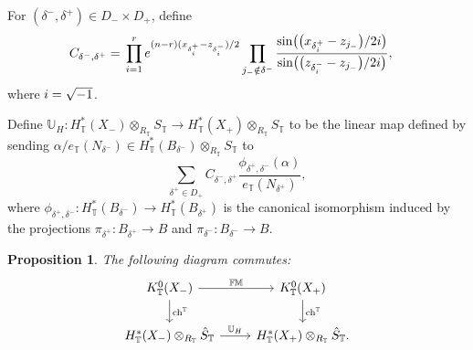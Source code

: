 \documentclass[11pt]{article}
\numberwithin{equation}{section}
\newtheorem{Proposition}[Theorem]{Proposition}
 { \theoremstyle{definition}
\newtheorem{Definition}[Theorem]{Definition}
\newtheorem{Note}[Theorem]{Note}
\newtheorem{Example}[Theorem]{Example}
\newtheorem{Remark}[Theorem]{Remark} }
\numberwithin{equation}{section}
\newcommand{\UU}{\mathbb{U}}
\newcommand{\torus}{\mathbb{T}}
\newcommand{\FM}{\mathbb{FM}}
\DeclareMathOperator{\ch}{ch}
\newcommand{\z}{z}
\newcommand{\x}{x}
\begin{document}
For $(\delta^-, \delta^+) \in D_{-} \times D_{+}$, define
\begin{align}\label{CD}
C_{\delta^-, \delta^+}
={}& \prod_{i=1}^r {\rm e}^{(n-r)(x_{\delta^+_i} - z_{\delta^-_i})/2} \prod_{j_- \notin \delta^-} \frac{\sin\bigl(\bigl(\x_{\delta^+_i} - \z_{j_-}\bigr)/2 {\rm i}\bigr)}{\sin\bigl(\bigl(\z_{\delta^-_i} - \z_{j_-}\bigr)/2 {\rm i}\bigr)},
\end{align}
where ${\rm i} = \sqrt{-1}$.

\begin{Definition}
\label{d:UH0}
Define $\UU_H\colon H^*_\torus(X_{-})\otimes_{R_\torus} S_\torus \to H^*_\torus(X_{+})\otimes_{R_\torus} S_\torus$ to be the linear map defined by sending
$\alpha/e_\torus(N_{\delta^-}) \in H^*_\torus(B_{\delta^-})\otimes_{R_\torus} S_\torus$ to
\begin{equation}\label{e:UH}
\sum_{\delta^+ \in D_+} C_{\delta^-, \delta^+}
\frac{ \phi_{\delta^+, \delta^-}(\alpha)}{e_\torus(N_{\delta^+})},
\end{equation}
where $\phi_{\delta^+, \delta^-}\colon H^*_\torus(B_{\delta^-}) \to H^*_\torus(B_{\delta^+})$ is the canonical isomorphism induced by the projections $\pi_{\delta^+}\colon B_{\delta^+} \to B$ and $\pi_{\delta^-}\colon B_{\delta^-} \to B$.
\end{Definition}

\begin{Proposition}\label{p:Kcom}
The following diagram commutes:
\[
\begin{tikzcd}
K^0_\torus(X_{-}) \ar[r, "\FM"] \ar[d, "\ch^\torus"] & K^0_\torus(X_{+}) \ar[d, "\ch^\torus"] \\ H^*_\torus(X_{-})\otimes_{R_\torus} \hat S_\torus \ar[r, "\UU_H"] & H^*_\torus(X_{+})\otimes_{R_\torus} \hat S_\torus.
\end{tikzcd}
\]
\end{Proposition}
\end{document}
